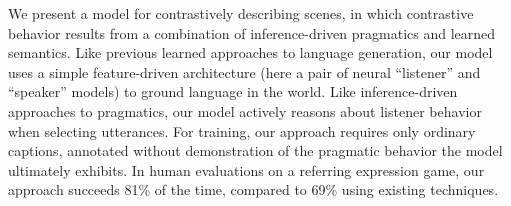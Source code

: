 We present a model for contrastively describing scenes, in which contrastive behavior results from a combination of inference-driven pragmatics and learned semantics.  Like previous learned approaches to language generation, our model uses a simple feature-driven architecture (here a pair of neural ``listener'' and ``speaker'' models) to ground language in the world. Like inference-driven approaches to pragmatics, our model actively reasons about listener behavior when selecting utterances. For training, our approach requires only ordinary captions, annotated without demonstration of the pragmatic behavior the model ultimately exhibits. In human evaluations on a referring expression game, our approach succeeds 81\% of the time, compared to 69\% using existing techniques.
